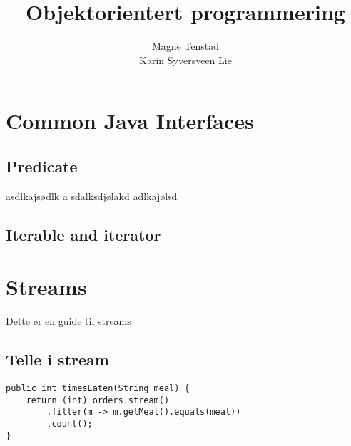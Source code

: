 \documentclass{article}
\title{Objektorientert programmering}
\author{Magne Tenstad \\ Karin Syversveen Lie}
\begin{document}
\maketitle

\clearpage

\tableofcontents

\clearpage

\section{Common Java Interfaces}
\subsection{Predicate}
asdlkajsødlk a
sdalksdjølakd
adlkajølsd

\subsection{Iterable and iterator}

\section{Streams}
Dette er en guide til streams

\subsection{Telle i stream}

\begin{verbatim}
public int timesEaten(String meal) {
    return (int) orders.stream()
        .filter(m -> m.getMeal().equals(meal))
        .count();
}
\end{verbatim}
\end{document}
